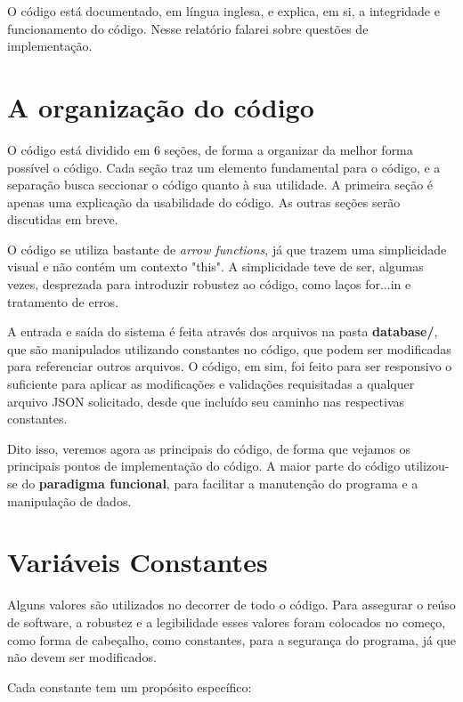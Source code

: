 \documentclass[12pt]{article}
\begin{document}
O código está documentado, em língua inglesa, e explica, em si, a integridade e funcionamento do código. Nesse relatório falarei sobre questões de implementação. 

\section{A organização do código}

O código está dividido em 6 seções, de forma a organizar da melhor forma possível o código. Cada seção traz um elemento fundamental para o código, e a separação busca seccionar o código quanto à sua utilidade. A primeira seção é apenas uma explicação da usabilidade do código. As outras seções serão discutidas em breve.

O código se utiliza bastante de \textit{arrow functions}, já que trazem uma simplicidade visual e não contém um contexto "this". A simplicidade teve  de ser, algumas vezes, desprezada para introduzir robustez ao código, como laços for...in e tratamento de erros.

A entrada e saída do sistema é feita através dos arquivos na pasta \textbf{database/}, que são manipulados utilizando constantes no código, que podem ser modificadas para referenciar outros arquivos. O código, em sim, foi feito para ser responsivo o suficiente para aplicar as modificações e validações requisitadas a qualquer arquivo JSON solicitado, desde que incluído seu caminho nas respectivas constantes. 

Dito isso, veremos agora as principais do código, de forma que vejamos os principais pontos de implementação do código. A maior parte do código utilizou-se do \textbf{paradigma funcional}, para facilitar a manutenção do programa e a manipulação de dados.

\section{Variáveis Constantes}

Alguns valores são utilizados no decorrer de todo o código. Para assegurar o reúso de software, a robustez e a legibilidade esses valores foram colocados no começo, como forma de cabeçalho, como constantes, para a segurança do programa, já que não devem ser modificados.

Cada constante tem um propósito específico:
\end{document}
